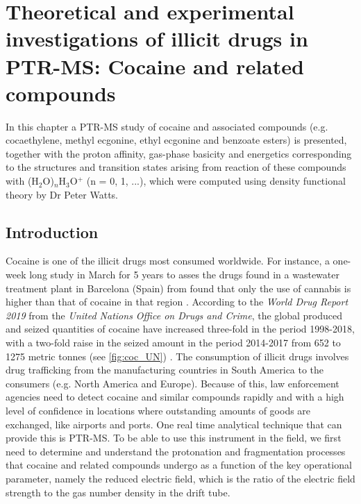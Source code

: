 
\chapter{Theoretical and experimental investigations of illicit drugs in PTR-MS: Cocaine and related compounds}
 
In this chapter a PTR-MS study of cocaine and associated compounds (e.g. cocaethylene, methyl ecgonine, ethyl ecgonine and benzoate esters) is presented, together with the proton affinity, gas-phase basicity and energetics corresponding to the structures and transition states arising from reaction of these compounds with (H$_2$O)$_n$H$_3$O$^+$ (n = 0, 1, ...), which were computed using density functional theory by Dr Peter Watts.
 
\section{Introduction}


Cocaine is one of the illicit   drugs most consumed  worldwide.
%
For instance, a one-week long study in March  for 5 years to asses the drugs found in a wastewater treatment plant in Barcelona (Spain) from \citeauthor{mastroianni2017five} found that only the use of cannabis is higher than that of cocaine in that region \cite{mastroianni2017five}.
%
According to the \textit{World Drug Report 2019} from the \textit{United Nations Office on Drugs and Crime}, the global produced and seized quantities of cocaine have increased three-fold in the period 1998-2018, with a two-fold raise in the seized amount in the period 2014-2017 from 652 to 1275 metric tonnes (see \autoref{fig:coc_UN}) \cite{united2019world}.
%
The consumption of illicit drugs involves drug trafficking from the manufacturing countries in South America to the  consumers (e.g. North America and Europe).
%
Because of this, law enforcement agencies need to  detect cocaine and similar compounds rapidly and with a high level of confidence in locations where outstanding amounts of goods are exchanged, like airports and ports. One real time analytical technique that can provide this is PTR-MS.  To be able to use this instrument in the field, we first need to determine and understand the protonation and fragmentation processes that cocaine and related compounds undergo as a function of the key operational parameter, namely the reduced electric field, which is the ratio of the electric field strength to the gas number density in the drift tube.


